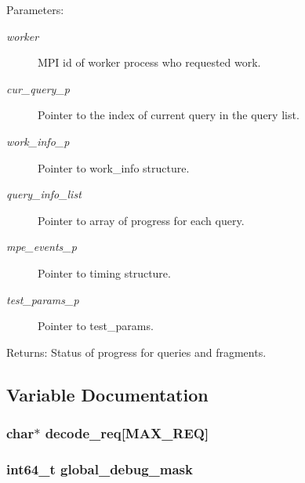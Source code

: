 \begin{Desc}
\item[Parameters:]
\begin{description}
\item[{\em worker}]MPI id of worker process who requested work. \item[{\em cur\_\-query\_\-p}]Pointer to the index of current query in the query list. \item[{\em work\_\-info\_\-p}]Pointer to work\_\-info structure. \item[{\em query\_\-info\_\-list}]Pointer to array of progress for each query. \item[{\em mpe\_\-events\_\-p}]Pointer to timing structure. \item[{\em test\_\-params\_\-p}]Pointer to test\_\-params. \end{description}
\end{Desc}
\begin{Desc}
\item[Returns:]Status of progress for queries and fragments. \end{Desc}


\subsection{Variable Documentation}
\subsubsection{\setlength{\rightskip}{0pt plus 5cm}char$\ast$ \bf{decode\_\-req}[MAX\_\-REQ]}\label{master__help_8h_b8304f1191eac06a2fd04538b0249528}


\subsubsection{\setlength{\rightskip}{0pt plus 5cm}int64\_\-t \bf{global\_\-debug\_\-mask}}\label{master__help_8h_1931c00ae0b7104d5c1c7473116ae1e4}


